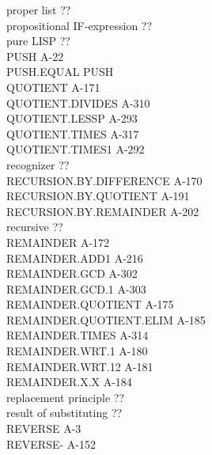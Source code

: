 \documentclass[10pt]{book}
\newenvironment{pubasis}{\begin{flushleft}}{\end{flushleft}}
\begin{document}
\begin{pubasis}
proper list                                  ??\\
propositional IF-expression                  ??\\
pure LISP                                    ??\\
PUSH                                         A-22\\
PUSH.EQUAL                                   PUSH\\
QUOTIENT                                     A-171\\
QUOTIENT.DIVIDES                             A-310\\
QUOTIENT.LESSP                               A-293\\
QUOTIENT.TIMES                               A-317\\
QUOTIENT.TIMES1                              A-292\\
recognizer                                   ??\\
RECURSION.BY.DIFFERENCE                      A-170\\
RECURSION.BY.QUOTIENT                        A-191\\
RECURSION.BY.REMAINDER                       A-202\\
recursive                                    ??\\
REMAINDER                                    A-172\\
REMAINDER.ADD1                               A-216\\
REMAINDER.GCD                                A-302\\
REMAINDER.GCD.1                              A-303\\
REMAINDER.QUOTIENT                           A-175\\
REMAINDER.QUOTIENT.ELIM                      A-185\\
REMAINDER.TIMES                              A-314\\
REMAINDER.WRT.1                              A-180\\
REMAINDER.WRT.12                             A-181\\
REMAINDER.X.X                                A-184\\
replacement principle                        ??\\
result of substituting                       ??\\
REVERSE                                      A-3\\
REVERSE-                                     A-152\\

\end{pubasis}
\end{document}
